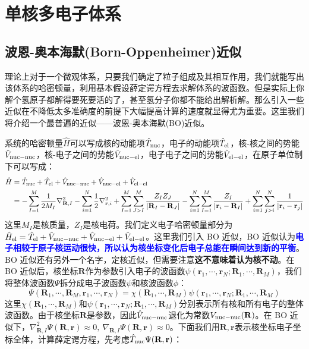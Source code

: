 \newpage
\section{单核多电子体系}
\subsection{波恩-奥本海默(Born-Oppenheimer)近似}\label{sec:bo}
理论上对于一个微观体系，只要我们确定了粒子组成及其相互作用，我们就能写出该体系的哈密顿量，利用基本假设薛定谔方程去求解体系的波函数。但是实际上你解个氢原子都解得要死要活的了，甚至氢分子你都不能给出解析解。那么引入一些近似在不降低太多准确度的前提下大幅提高计算的速度就显得尤为重要。这里我们将介绍一个最普遍的近似——波恩-奥本海默(BO)近似。

系统的哈密顿量$\hat{H}$可以写成核的动能项$\hat{T}_{\rm nuc}$，电子的动能项$\hat{T}_{\rm el}$，核-核之间的势能$\hat{V}_{\rm nuc-nuc}$，核-电子之间的势能$\hat{V}_{\rm nuc-el}$，电子电子之间的势能$\hat{V}_{\rm el-el}$，在原子单位制下可以写成：
\begin{equation}\label{eq:hamiltonian_bo}
\begin{aligned}
\hat{H}&=\hat{T}_{\rm nuc}+\hat{T}_{\rm el}+\hat{V}_{\rm nuc-nuc}+\hat{V}_{\rm nuc-el}+\hat{V}_{\rm el-el}\\
&=-\sum_{I=1}^M\frac{1}{2M_I}\nabla^2_{\mathbf{R},I}-\sum_{i=1}^N\frac{1}{2}\nabla^2_{\mathbf{r},i}+\sum_{I=1}^{M}\sum_{J>I}^{M}\frac{Z_{I}Z_{J}}{|\mathbf{R}_{I}-\mathbf{R}_{J}|}-\sum_{i=1}^{N}\sum_{I=1}^{M}\frac{Z_{I}}{|\mathbf{r}_{i}-\mathbf{R}_{I}|}+\sum_{i=1}^{N}\sum_{j>i}^{N}\frac{1}{|\mathbf{r}_{i}-\mathbf{r}_{j}|}\\
\end{aligned}
\end{equation}
这里$M_I$是核质量，$Z_I$是核电荷。我们定义电子哈密顿量部分为$\hat{H}_{\rm el}=\hat{T}_{\rm el}+\hat{V}_{\rm nuc-nuc}+\hat{V}_{\rm nuc-el}+\hat{V}_{\rm el-el}$。这里我们引入 BO 近似，BO 近似认为\textcolor{blue}{\textbf{电子相较于原子核运动很快，所以认为核坐标变化后电子总能在瞬间达到新的平衡}}。BO 近似还有另外一个名字，定核近似，但需要注意\textbf{这不意味着认为核不动}。在 BO 近似后，核坐标$\mathbf{R}$作为参数引入电子的波函数$\psi(\mathbf{r}_1,\cdots,\mathbf{r}_N;\mathbf{R}_1,\cdots,\mathbf{R}_M)$，我们将整体波函数$\Psi$拆分成电子波函数$\psi$和核波函数$\phi$：
\[\Psi(\mathbf{R}_1,\cdots,\mathbf{R}_M,\mathbf{r}_1,\cdots,\mathbf{r}_N)=\chi(\mathbf{R}_1,\cdots,\mathbf{R}_M)\psi(\mathbf{r}_1,\cdots,\mathbf{r}_N;\mathbf{R}_1,\cdots,\mathbf{R}_M)\]
这里$\chi(\mathbf{R}_1,\cdots,\mathbf{R}_M)$和$\psi(\mathbf{r}_1,\cdots,\mathbf{r}_N;\mathbf{R}_1,\cdots,\mathbf{R}_M)$分别表示所有核和所有电子的整体波函数。由于核坐标$\mathbf{R}$是参数，因此$\hat{V}_{\rm nuc-nuc}$退化为常数$V_{\rm nuc-nuc}(\mathbf{R})$。在 BO 近似下，$\nabla^2_{\mathbf{R},I}\Psi(\mathbf{R},\mathbf{r}) \approx 0, \ \nabla_{\mathbf{R},I}\Psi(\mathbf{R},\mathbf{r}) \approx 0$。下面我们用$\mathbf{R},\mathbf{r}$表示核坐标电子坐标全体，计算薛定谔方程，先考虑$\hat{T}_{\rm nuc}\Psi(\mathbf{R},\mathbf{r})$：
